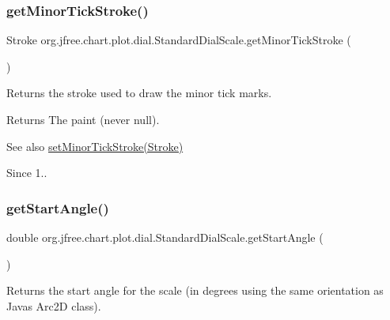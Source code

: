 \subsubsection{\texorpdfstring{get\+Minor\+Tick\+Stroke()}{getMinorTickStroke()}}
{\footnotesize\ttfamily Stroke org.\+jfree.\+chart.\+plot.\+dial.\+Standard\+Dial\+Scale.\+get\+Minor\+Tick\+Stroke (\begin{DoxyParamCaption}{ }\end{DoxyParamCaption})}

Returns the stroke used to draw the minor tick marks.

\begin{DoxyReturn}{Returns}
The paint (never {\ttfamily null}).
\end{DoxyReturn}
\begin{DoxySeeAlso}{See also}
\mbox{\hyperlink{classorg_1_1jfree_1_1chart_1_1plot_1_1dial_1_1_standard_dial_scale_a5fe083a0e5dfb8877002fbc2070b4d00}{set\+Minor\+Tick\+Stroke(\+Stroke)}}
\end{DoxySeeAlso}
\begin{DoxySince}{Since}
1.. 
\end{DoxySince}
\mbox{\label{classorg_1_1jfree_1_1chart_1_1plot_1_1dial_1_1_standard_dial_scale_a89929cd8cb1353ecd67b765bd81a75f7}} 
\subsubsection{\texorpdfstring{get\+Start\+Angle()}{getStartAngle()}}
{\footnotesize\ttfamily double org.\+jfree.\+chart.\+plot.\+dial.\+Standard\+Dial\+Scale.\+get\+Start\+Angle (\begin{DoxyParamCaption}{ }\end{DoxyParamCaption})}

Returns the start angle for the scale (in degrees using the same orientation as Java\textquotesingle{}s {\ttfamily Arc2D} class).

